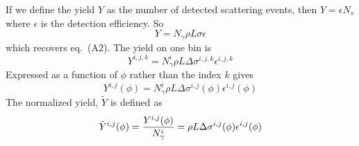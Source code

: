 \documentclass{article}
\begin{document}
If we define the yield $Y$ as the number of detected scattering events, then $Y = \epsilon N_s$ where $\epsilon$ is the detection efficiency. So
$$
Y = N_\gamma\rho L\sigma\epsilon
$$
which recovers eq.~(A2). The yield on one bin is
$$
Y^{i,j,k} = N^i_\gamma\rho L\Delta\sigma^{i,j,k}\epsilon^{i,j,k}
$$
Expressed as a function of $\phi$ rather than the index $k$ gives
$$
Y^{i,j}(\phi) = N^i_\gamma\rho L\Delta\sigma^{i,j}(\phi)\epsilon^{i,j}(\phi)
$$
The normalized yield, $\tilde Y$ is defined as
$$
\tilde Y^{i,j}(\phi) = {Y^{i,j}(\phi) \over N^i_\gamma} = \rho L\Delta\sigma^{i,j}(\phi)\epsilon^{i,j}(\phi)
$$
\end{document}
